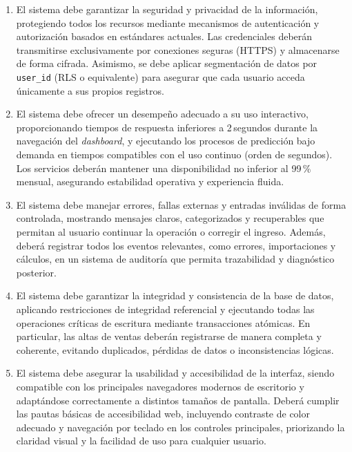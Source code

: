 \begin{enumerate}[label=RNF-\arabic*., leftmargin=*, nosep]

  \item El sistema debe garantizar la seguridad y privacidad de la información, protegiendo todos los recursos mediante mecanismos de autenticación y autorización basados en estándares actuales. Las credenciales deberán transmitirse exclusivamente por conexiones seguras (HTTPS) y almacenarse de forma cifrada. Asimismo, se debe aplicar segmentación de datos por \texttt{user\_id} (RLS o equivalente) para asegurar que cada usuario acceda únicamente a sus propios registros.

  \item El sistema debe ofrecer un desempeño adecuado a su uso interactivo, proporcionando tiempos de respuesta inferiores a 2\,segundos durante la navegación del \textit{dashboard}, y ejecutando los procesos de predicción bajo demanda en tiempos compatibles con el uso continuo (orden de segundos). Los servicios deberán mantener una disponibilidad no inferior al 99\,\% mensual, asegurando estabilidad operativa y experiencia fluida.

  \item El sistema debe manejar errores, fallas externas y entradas inválidas de forma controlada, mostrando mensajes claros, categorizados y recuperables que permitan al usuario continuar la operación o corregir el ingreso. Además, deberá registrar todos los eventos relevantes, como errores, importaciones y cálculos, en un sistema de auditoría que permita trazabilidad y diagnóstico posterior.

  \item El sistema debe garantizar la integridad y consistencia de la base de datos, aplicando restricciones de integridad referencial y ejecutando todas las operaciones críticas de escritura mediante transacciones atómicas. En particular, las altas de ventas deberán registrarse de manera completa y coherente, evitando duplicados, pérdidas de datos o inconsistencias lógicas.

  \item El sistema debe asegurar la usabilidad y accesibilidad de la interfaz, siendo compatible con los principales navegadores modernos de escritorio y adaptándose correctamente a distintos tamaños de pantalla. Deberá cumplir las pautas básicas de accesibilidad web, incluyendo contraste de color adecuado y navegación por teclado en los controles principales, priorizando la claridad visual y la facilidad de uso para cualquier usuario.


\end{enumerate}
